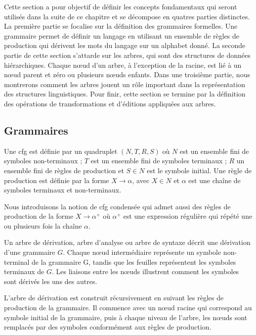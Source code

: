 Cette section a pour objectif de définir les concepts fondamentaux qui seront utilisés dans la suite de ce chapitre et se décompose en quatres parties distinctes.
La première partie se focalise sur la définition des grammaires formelles.
Une grammaire permet de définir un langage en utilisant un ensemble de règles de production qui dérivent les mots du langage sur un alphabet donné.
La seconde partie de cette section s'attarde sur les arbres, qui sont des structures de données hiérarchiques.
Chaque nœud d'un arbre, à l'exception de la racine, est lié à un nœud parent et zéro ou plusieurs nœuds enfants.
Dans une troisième partie, nous montrerons comment les arbres jouent un rôle important dans la représentation des structures linguistiques.
Pour finir, cette section se termine par la définition des opérations de transformations et d'éditions appliquées aux arbres.

\subsection{Grammaires}

\begin{definition}
    Une \gls{cfg} est définie par un quadruplet $(N, T, R, S)$ où $N$ est un ensemble fini de symboles non-terminaux ; $T$ est un ensemble fini de symboles terminaux ; $R$ un ensemble fini de règles de production et $S \in N$ est le symbole initial.
    Une règle de production est définie par la forme $X \to \alpha$, avec $X \in N$ et $\alpha$ est une chaîne de symboles terminaux et non-terminaux.

    Nous introduisons la notion de \gls{cfg} condensée qui admet aussi des règles de production de la forme $X \to \alpha^+$ où $\alpha^+$ est une expression régulière qui répété une ou plusieurs fois la chaîne $\alpha$.
\end{definition}

\begin{definition}
    Un arbre de dérivation, arbre d'analyse ou arbre de syntaxe décrit une dérivation d'une grammaire $G$.
    Chaque nœud intermédiaire représente un symbole non-terminal de la grammaire G, tandis que les feuilles représentent les symboles terminaux de $G$.
    Les liaisons entre les nœuds illustrent comment les symboles sont dérivés les uns des autres.

    L'arbre de dérivation est construit récursivement en suivant les règles de production de la grammaire.
    Il commence avec un nœud racine qui correspond au symbole initial de la grammaire, puis à chaque niveau de l'arbre, les nœuds sont remplacés par des symboles conformément aux règles de production.
\end{definition}

